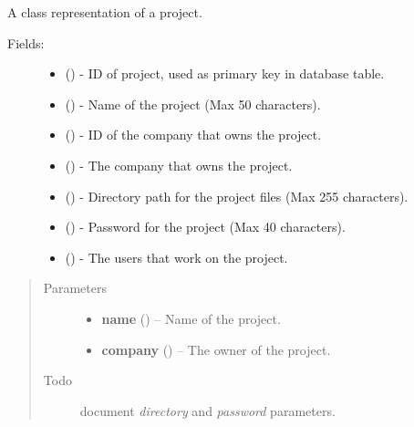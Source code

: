 \documentclass[letterpaper,10pt,english]{sphinxmanual}
\begin{document}
\begin{fulllineitems}
\label{models:models.Project}
A class representation of a project.
\begin{description}
\item[{Fields:}] \leavevmode\begin{itemize}
\item {} 
        ()        - ID of project, used as primary key in database table.

\item {} 
        ()        - Name of the project (Max 50 characters).

\item {} 
        ()        - ID of the company that owns the project.

\item {} 
 ()        - The company that owns the project.

\item {} 
        ()        - Directory path for the project files (Max 255 characters).

\item {} 
        ()        - Password for the project (Max 40 characters).

\item {} 
 ()        - The users that work on the project.

\end{itemize}

\end{description}
\begin{quote}\begin{description}
\item[{Parameters}] \leavevmode\begin{itemize}
\item {} 
\textbf{name} () -- Name of the project.

\item {} 
\textbf{company} ({\hyperref[models:models.Company]{}}) -- The owner of the project.

\end{itemize}

\item[{Todo }] \leavevmode
document \emph{directory} and \emph{password} parameters.

\end{description}\end{quote}

\end{fulllineitems}
\end{document}
